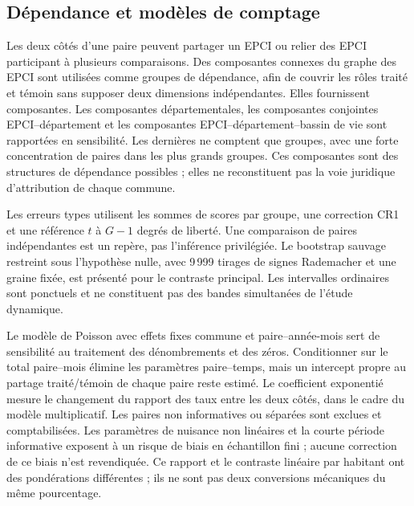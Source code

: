 \subsection{Dépendance et modèles de comptage}
Les deux côtés d’une paire peuvent partager un EPCI ou relier des EPCI participant à plusieurs comparaisons. Des composantes connexes du graphe des EPCI sont utilisées comme groupes de dépendance, afin de couvrir les rôles traité et témoin sans supposer deux dimensions indépendantes. Elles fournissent \EPCIComponentsN{} composantes. Les composantes départementales, les composantes conjointes EPCI–département et les composantes EPCI–département–bassin de vie sont rapportées en sensibilité. Les dernières ne comptent que \EDBComponentsN{} groupes, avec une forte concentration de paires dans les plus grands groupes. Ces composantes sont des structures de dépendance possibles ; elles ne reconstituent pas la voie juridique d’attribution de chaque commune.

Les erreurs types utilisent les sommes de scores par groupe, une correction CR1 et une référence $t$ à $G-1$ degrés de liberté. Une comparaison de paires indépendantes est un repère, pas l’inférence privilégiée. Le bootstrap sauvage restreint sous l’hypothèse nulle, avec 9\,999 tirages de signes Rademacher et une graine fixée, est présenté pour le contraste principal. Les intervalles ordinaires sont ponctuels et ne constituent pas des bandes simultanées de l’étude dynamique.

Le modèle de Poisson avec effets fixes commune et paire–année-mois sert de sensibilité au traitement des dénombrements et des zéros. Conditionner sur le total paire–mois élimine les paramètres paire–temps, mais un intercept propre au partage traité/témoin de chaque paire reste estimé. Le coefficient exponentié mesure le changement du rapport des taux entre les deux côtés, dans le cadre du modèle multiplicatif. Les paires non informatives ou séparées sont exclues et comptabilisées. Les paramètres de nuisance non linéaires et la courte période informative exposent à un risque de biais en échantillon fini ; aucune correction de ce biais n’est revendiquée. Ce rapport et le contraste linéaire par habitant ont des pondérations différentes ; ils ne sont pas deux conversions mécaniques du même pourcentage.

